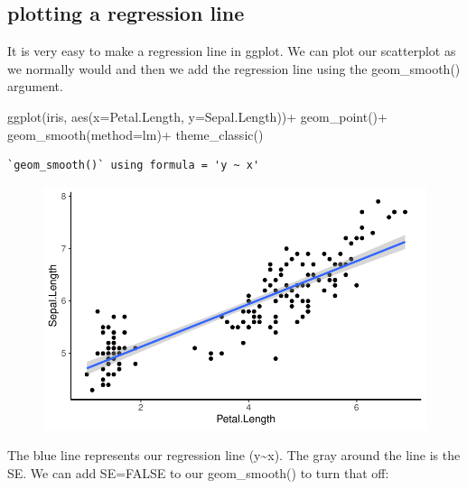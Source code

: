 \documentclass[
  letterpaper,
  DIV=11,
  numbers=noendperiod]{scrartcl}
\newenvironment{Shaded}{\begin{snugshade}}{\end{snugshade}}
\newcommand{\AttributeTok}[1]{\textcolor[rgb]{0.40,0.45,0.13}{#1}}
\newcommand{\FunctionTok}[1]{\textcolor[rgb]{0.28,0.35,0.67}{#1}}
\newcommand{\NormalTok}[1]{\textcolor[rgb]{0.00,0.23,0.31}{#1}}
\newcommand{\SpecialCharTok}[1]{\textcolor[rgb]{0.37,0.37,0.37}{#1}}
\newcommand{\StringTok}[1]{\textcolor[rgb]{0.13,0.47,0.30}{#1}}
\begin{document}
\subsection{plotting a regression line}

It is very easy to make a regression line in ggplot. We can plot our
scatterplot as we normally would and then we add the regression line
using the geom\_smooth() argument.

\begin{Shaded}
\begin{Highlighting}[]
\FunctionTok{ggplot}\NormalTok{(iris, }\FunctionTok{aes}\NormalTok{(}\AttributeTok{x=}\NormalTok{Petal.Length, }\AttributeTok{y=}\NormalTok{Sepal.Length))}\SpecialCharTok{+}
  \FunctionTok{geom\_point}\NormalTok{()}\SpecialCharTok{+}
  \FunctionTok{geom\_smooth}\NormalTok{(}\AttributeTok{method=}\StringTok{\textquotesingle{}lm\textquotesingle{}}\NormalTok{)}\SpecialCharTok{+}
  \FunctionTok{theme\_classic}\NormalTok{()}
\end{Highlighting}
\end{Shaded}

\begin{verbatim}
`geom_smooth()` using formula = 'y ~ x'
\end{verbatim}

\begin{figure}[H]

{\centering \includegraphics{cor_reg_chi_files/figure-pdf/unnamed-chunk-12-1.pdf}

}

\end{figure}

\hfill\break
The blue line represents our regression line (y\textasciitilde x). The
gray around the line is the SE. We can add SE=FALSE to our
geom\_smooth() to turn that off:
\end{document}

